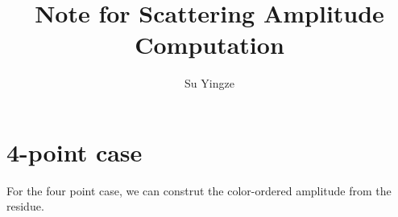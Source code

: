 \documentclass[12pt]{article}
\begin{document}
\title{Note for Scattering Amplitude Computation}
\author{Su Yingze}
\maketitle

\section{4-point case}
For the four point case, we can construt the color-ordered amplitude from the residue.
\end{document}
